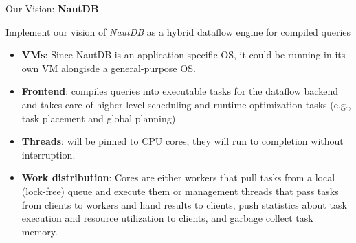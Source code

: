 \begin{block}{Our Vision: \textbf{NautDB}}

  Implement our vision of \textit{NautDB} as a hybrid dataflow engine
  for compiled queries

  \begin{itemize}

  \item \textbf{VMs}: Since NautDB is an application-specific OS, it
    could be running in its own VM alongisde a general-purpose OS.

  \item \textbf{Frontend}: compiles queries into executable tasks for
    the dataflow backend and takes care of higher-level scheduling and
    runtime optimization tasks (e.g., task placement and global
    planning)

  \item \textbf{Threads}: will be pinned to CPU cores; they will run
    to completion without interruption.

  \item \textbf{Work distribution}: Cores are either workers that pull
    tasks from a local (lock-free) queue and execute them or
    management threads that pass tasks from clients to workers and
    hand results to clients, push statistics about task execution and
    resource utilization to clients, and garbage collect task memory.

  \end{itemize}
\end{block}



